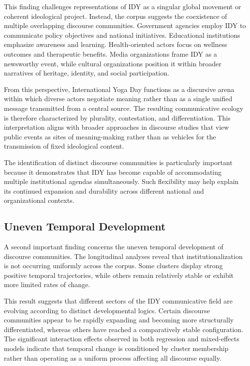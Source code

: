 \documentclass[11pt]{article}
\begin{document}
This finding challenges representations of IDY as a singular global movement or coherent ideological project. Instead,
the corpus suggests the coexistence of multiple overlapping discourse communities. Government agencies employ IDY to
communicate policy objectives and national initiatives. Educational institutions emphasize awareness and learning.
Health-oriented actors focus on wellness outcomes and therapeutic benefits. Media organizations frame IDY as a
newsworthy event, while cultural organizations position it within broader narratives of heritage, identity, and social
participation.


From this perspective, International Yoga Day functions as a discursive arena within which diverse actors negotiate
meaning rather than as a single unified message transmitted from a central source. The resulting communicative ecology
is therefore characterized by plurality, contestation, and differentiation. This interpretation aligns with broader
approaches in discourse studies that view public events as sites of meaning-making rather than as vehicles for the
transmission of fixed ideological content.


The identification of distinct discourse communities is particularly important because it demonstrates that IDY has
become capable of accommodating multiple institutional agendas simultaneously. Such flexibility may help explain its
continued expansion and durability across different national and organizational contexts.


\subsection{Uneven Temporal Development}



A second important finding concerns the uneven temporal development of discourse communities. The longitudinal analyses
reveal that institutionalization is not occurring uniformly across the corpus. Some clusters display strong positive
temporal trajectories, while others remain relatively stable or exhibit more limited rates of change.


This result suggests that different sectors of the IDY communicative field are evolving according to distinct
developmental logics. Certain discourse communities appear to be rapidly expanding and becoming more structurally
differentiated, whereas others have reached a comparatively stable configuration. The significant interaction effects
observed in both regression and mixed-effects models indicate that temporal change is conditioned by cluster membership
rather than operating as a uniform process affecting all discourse equally.
\end{document}

